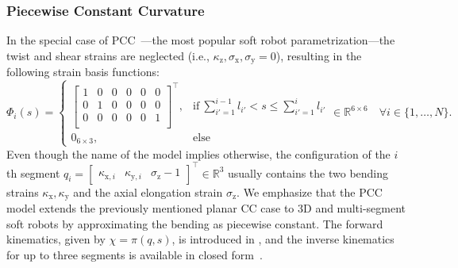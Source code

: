 \subsubsection{Piecewise Constant Curvature}
In the special case of \gls{PCC}~\citep{webster2010design}—the most popular soft robot parametrization—the twist and shear strains are neglected (i.e., $\kappa_\mathrm{z}, \sigma_\mathrm{x}, \sigma_\mathrm{y} = 0$), resulting in the following strain basis functions:
\begin{equation}
    \Phi_i(s) = \begin{cases}
        \begin{bmatrix}
            1 & 0 & 0 & 0 & 0 & 0\\
            0 & 1 & 0 & 0 & 0 & 0\\
            0 & 0 & 0 & 0 & 0 & 1\\
        \end{bmatrix}^\top
        , & \text{if} \: \sum_{i'=1}^{i-1} l_{i'} < s \leq \sum_{i'= 1}^{i} l_{i'} \\
        0_{6\times 3}, & \text{else}
    \end{cases} \in \mathbb{R}^{6 \times 6} \quad \forall i \in \{ 1,\dots, N \}.
\end{equation}
Even though the name of the model implies otherwise, the configuration of the $i$th segment $q_i=\begin{bmatrix}
    \kappa_{\mathrm{x},i} & \kappa_{\mathrm{y},i} & \sigma_\mathrm{z}-1
\end{bmatrix}^\top \in \mathbb{R}^3$ usually contains the two bending strains $\kappa_\mathrm{x}, \kappa_\mathrm{y}$ and the axial elongation strain $\sigma_\mathrm{z}$.
We emphasize that the \gls{PCC} model extends the previously mentioned planar \gls{CC} case to 3D and multi-segment soft robots by approximating the bending as piecewise constant. The forward kinematics, given by $\chi=\pi(q,s)$, is introduced in \citet{webster2010design, della2020improved}, and the inverse kinematics for up to three segments is available in closed form~\citep{li2023kinematics}.

